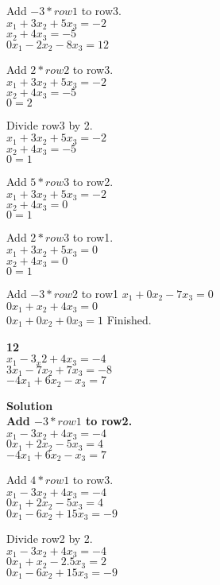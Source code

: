 \documentclass{article}
\begin{document}
Add $-3*row1$ to row3.\\
$x_{1} + 3x_{2} + 5x_{3} = -2$\\
$x_{2} + 4x_{3} = -5$\\
$0x_{1} - 2x_{2} - 8x_{3} = 12$

Add $2*row2$ to row3.\\
$x_{1} + 3x_{2} + 5x_{3} = -2$\\
$x_{2} + 4x_{3} = -5$\\
$0 = 2$

Divide row3 by 2.\\
$x_{1} + 3x_{2} + 5x_{3} = -2$\\
$x_{2} + 4x_{3} = -5$\\
$0 = 1$

Add $5*row3$ to row2.\\
$x_{1} + 3x_{2} + 5x_{3} = -2$\\
$x_{2} + 4x_{3} = 0$\\
$0 = 1$

Add $2*row3$ to row1.\\
$x_{1} + 3x_{2} + 5x_{3} = 0$\\
$x_{2} + 4x_{3} = 0$\\
$0 = 1$

Add $-3*row2$ to row1
$x_{1} + 0x_{2} - 7x_{3} = 0$\\
$0x_{1} + x_{2} + 4x_{3} = 0$\\
$0x_{1} + 0x_{2} + 0x_{3} = 1$
Finished.

\bf{12}\\
$x_{1} - 3_x{2} + 4x_{3} = -4$\\
$3x_{1} - 7x_{2} + 7x_{3} = -8$\\
$-4x_{1} + 6x_{2} - x_{3} = 7$

\bf{Solution}\\
Add $-3*row1$ to row2.\\
$x_{1} - 3x_{2} + 4x_{3} = -4$\\
$0x_{1} + 2x_{2} - 5x_{3} = 4$\\
$-4x_{1} + 6x_{2} - x_{3} = 7$

Add $4*row1$ to row3.\\
$x_{1} - 3x_{2} + 4x_{3} = -4$\\
$0x_{1} + 2x_{2} - 5x_{3} = 4$\\
$0x_{1} - 6x_{2} + 15x_{3} = -9$

Divide row2 by 2.\\
$x_{1} - 3x_{2} + 4x_{3} = -4$\\
$0x_{1} + x_{2} - 2.5x_{3} = 2$\\
$0x_{1} - 6x_{2} + 15x_{3} = -9$
\end{document}
